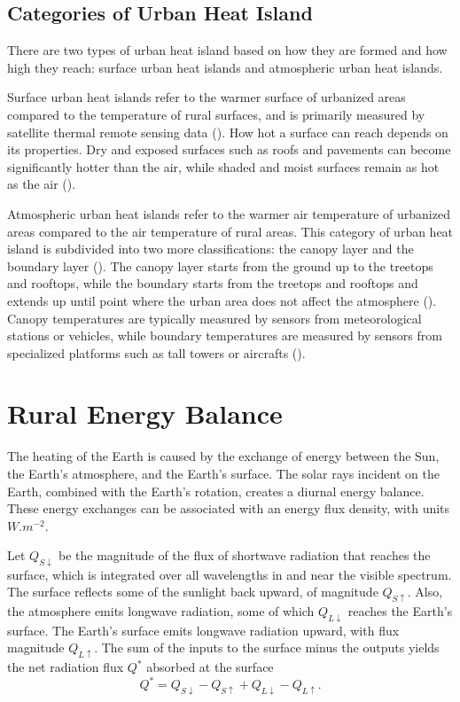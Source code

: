 \subsection{Categories of Urban Heat Island}
	
	There are two types of urban heat island based on how they are formed and how high they reach:
	surface urban heat islands and atmospheric urban heat islands.

	Surface urban heat islands refer to the warmer surface of urbanized areas compared to the temperature of rural surfaces, and is primarily measured by satellite thermal remote sensing data (\cite{Zhou2018}). 
	How hot a surface can reach depends on its properties.
	Dry and exposed surfaces such as roofs and pavements can become significantly hotter than the air, while shaded and moist surfaces remain as hot as the air (\cite{Khan2021}). 
	
	Atmospheric urban heat islands refer to the warmer air temperature of urbanized areas compared to the air temperature of rural areas.
	This category of urban heat island is subdivided into two more classifications:
	the canopy layer and the boundary layer (\cite{Zhou2018}).
	The canopy layer starts from the ground up to the treetops and rooftops, 
	while the boundary starts from the treetops and rooftops and extends up until point where the urban area does not affect the atmosphere (\cite{Khan2021}).
	Canopy temperatures are typically measured by sensors from meteorological stations or vehicles,
	while boundary temperatures are measured by sensors from specialized platforms such as tall towers or aircrafts (\cite{Zhou2018}).

\section{Rural Energy Balance}
	The heating of the Earth is caused by the exchange of energy between the Sun, the Earth's atmosphere, and the Earth's surface.
	The solar rays incident on the Earth, combined with the Earth's rotation, creates a diurnal energy balance.
	These energy exchanges can be associated with an energy flux density, with units $\si{W.m^{-2}}$.
	
	Let $Q_{S\downarrow}$ be the magnitude of the flux of shortwave radiation that reaches the surface, which is integrated over all wavelengths in and near	the visible spectrum.
	The surface reflects some of the sunlight back upward, of magnitude $Q_{S\uparrow}$.
	Also, the atmosphere emits longwave radiation, some of which
	$Q_{L\downarrow}$ reaches the Earth’s surface.
	The Earth’s surface emits longwave radiation upward, with flux magnitude $Q_{L\uparrow}$. 
	The sum of the inputs to the surface minus the outputs yields the net radiation flux $Q^*$ absorbed at the
	surface
	\begin{equation}
		Q^* = Q_{S\downarrow} - Q_{S\uparrow} + Q_{L\downarrow} - Q_{L\uparrow}.
	\end{equation}
	
